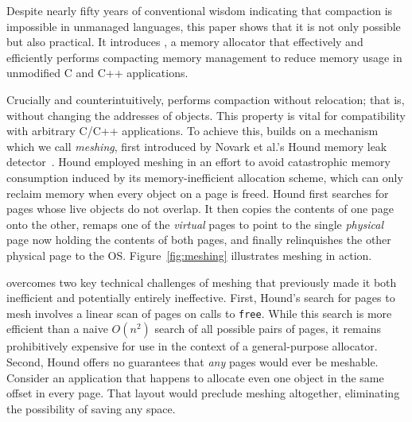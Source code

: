 




Despite nearly fifty years of conventional wisdom indicating that
compaction is impossible in unmanaged languages, this paper shows that
it is not only possible but also practical. It introduces
\Mesh, a memory allocator that effectively and efficiently performs
compacting memory management to reduce memory usage in unmodified
C and C++ applications.

Crucially and counterintuitively, \Mesh performs compaction without
relocation; that is, without changing the addresses of objects. This
property is vital for compatibility with arbitrary C/C++
applications. To achieve this, \Mesh{} builds on a mechanism which we
call \emph{meshing}, first introduced by Novark et al.'s Hound memory
leak detector~\cite{1542521}. Hound employed meshing in an effort to avoid
catastrophic memory consumption induced by its memory-inefficient
allocation scheme, which can only reclaim memory when every object on
a page is freed. Hound first searches for pages whose live objects do
not overlap. It then copies the contents of one page onto the other,
remaps one of the \emph{virtual} pages to point to the single
\emph{physical} page now holding the contents of both pages, and
finally relinquishes the other physical page to the
OS. Figure~\ref{fig:meshing} illustrates meshing in action.

\Mesh{} overcomes two key technical challenges of meshing that previously made
it both inefficient and potentially entirely ineffective. First,
Hound's search for pages to mesh involves a linear scan of pages on
calls to \texttt{free}. While this search is more efficient than a
naive $O(n^2)$ search of all possible pairs of pages, it remains
prohibitively expensive for use in the context of a general-purpose
allocator. Second, Hound offers no guarantees that \emph{any} pages
would ever be meshable.  Consider an application that happens to
allocate even one object in the same offset in every page. That layout
would preclude meshing altogether, eliminating the possibility of
saving any space.


